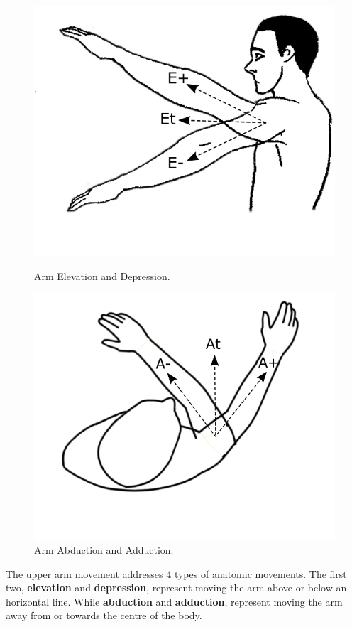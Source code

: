 \begin{figure}[!t]
  \centering
  \includegraphics[width=0.8\linewidth]{imgs/approach/elevation_depression}
    \caption{Arm Elevation and Depression.}
    \label{fig:elevation_depression}
    \endminipage\hfill
{}
  \centering
  \includegraphics[width=0.8\linewidth]{imgs/approach/abduction_adduction}
    \caption{Arm Abduction and Adduction.}
    \label{fig:abduction_adduction}
    \endminipage
\end{figure}



The upper arm movement addresses 4 types of anatomic movements. 
The first two, \textbf{elevation} and \textbf{depression}, represent moving the arm above or below an horizontal line. 
While \textbf{abduction} and \textbf{adduction}, represent moving the arm away from or towards the centre of the body.

